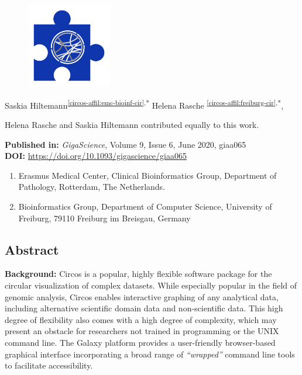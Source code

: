 \cleartorightpage
\setcounter{NAT@ctr}{-1}
\chapter*{}\label{chapter:circos}

\begin{figure}[t!]
\centering
\includegraphics[height=10em]{frontmatter/images/chapter-header-circos.png}
\end{figure}
\vspace{-4cm}



Saskia Hiltemann\textsuperscript{\ref{circos-affil:emc-bioinf-cir},*}
Helena Rasche \textsuperscript{\ref{circos-affil:freiburg-cir},*},

{\color{chaptergrey}{*}} Helena Rasche and Saskia Hiltemann contributed equally to this work.

\textbf{Published in:} \emph{GigaScience}, Volume 9, Issue 6, June 2020, giaa065 \\
\textbf{DOI:} \url{https://doi.org/10.1093/gigascience/giaa065}

\small
\begin{enumerate}
 \itemsep-0.5em
 \item Erasmus Medical Center, Clinical Bioinformatics Group, Department of Pathology, Rotterdam, The Netherlands.\label{circos-affil:emc-bioinf-cir}
 \item Bioinformatics Group, Department of Computer Science, University of Freiburg, 79110 Freiburg im Breisgau, Germany\label{circos-affil:freiburg-cir}
\end{enumerate}
\normalsize


\section*{Abstract}

\textbf{Background:}
Circos is a popular, highly flexible software package for the circular visualization of complex datasets. While especially popular in the field of genomic analysis, Circos enables interactive graphing of any analytical data, including alternative scientific domain data and non-scientific data. This high degree of flexibility also comes with a high degree of complexity, which may present an obstacle for researchers not trained in programming or the UNIX command line. The Galaxy platform provides a user-friendly browser-based graphical interface incorporating a broad range of \emph{“wrapped”} command line tools to facilitate accessibility.


